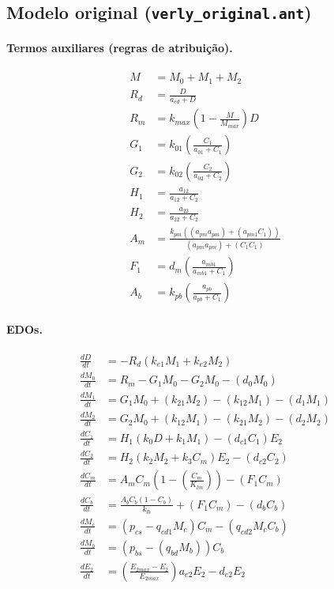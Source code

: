 \documentclass[11pt]{article}
\begin{document}
\subsection{Modelo original (\texttt{verly\_original.ant})}

\paragraph{Termos auxiliares (regras de atribuição).}
\begin{align}
M   &= M_0 + M_1 + M_2 \\
R_d &= \frac{D}{a_{ed} + D} \\
R_m &= k_{max} \left(1 - \frac{M}{M_{max}}\right) D \\
G_1 &= k_{01} \left(\frac{C_1}{a_{01} + C_1}\right) \\
G_2 &= k_{02} \left(\frac{C_2}{a_{02} + C_2}\right) \\
H_1 &= \frac{a_{12}}{a_{12} + C_2} \\
H_2 &= \frac{a_{22}}{a_{22} + C_2} \\
A_m &= \frac{k_{pm} \left((a_{pm} a_{pm}) + (a_{pm1} C_1)\right)}{(a_{pm} a_{pm}) + (C_1 C_1)} \\
F_1 &= d_m \left(\frac{a_{mb1}}{a_{mb1} + C_1}\right) \\
A_b &= k_{pb} \left(\frac{a_{pb}}{a_{pb} + C_1}\right)
\end{align}

\paragraph{EDOs.}
\begin{align}
\frac{dD}{dt}   &= -R_d (k_{e1} M_1 + k_{e2} M_2) \\
\frac{dM_0}{dt} &= R_m - G_1 M_0 - G_2 M_0 - (d_0 M_0) \\
\frac{dM_1}{dt} &= G_1 M_0 + (k_{21} M_2) - (k_{12} M_1) - (d_1 M_1) \\
\frac{dM_2}{dt} &= G_2 M_0 + (k_{12} M_1) - (k_{21} M_2) - (d_2 M_2) \\
\frac{dC_1}{dt} &= H_1 (k_0 D + k_1 M_1) - (d_{c1} C_1) E_2 \\
\frac{dC_2}{dt} &= H_2 (k_2 M_2 + k_3 C_m) E_2 - (d_{c2} C_2) \\
\frac{dC_m}{dt} &= A_m C_m \left(1 - \left(\frac{C_m}{K_{lm}}\right)\right) - (F_1 C_m) \\
\frac{dC_b}{dt} &= \frac{A_b C_b (1 - C_b)}{k_{lb}} + (F_1 C_m) - (d_b C_b) \\
\frac{dM_c}{dt} &= (p_{cs} - q_{cd1} M_c) C_m - (q_{cd2} M_c C_b) \\
\frac{dM_b}{dt} &= (p_{bs} - (q_{bd} M_b)) C_b \\
\frac{dE_2}{dt} &= \left(\frac{E_{2max} - E_2}{E_{2max}}\right) a_{e2} E_2 - d_{e2} E_2
\end{align}
\end{document}
